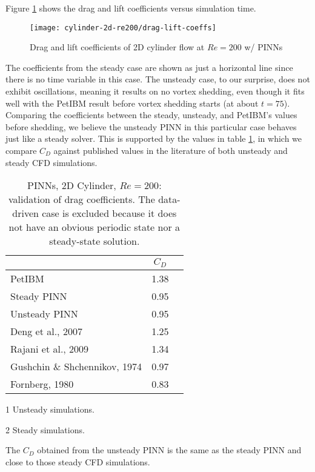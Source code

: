 Figure \ref{fig:cylinder-re200-drag-lift} shows the drag and lift coefficients versus simulation time.
\begin{figure}[t]
    \centering%
    \texttt{[image: cylinder-2d-re200/drag-lift-coeffs]}%
    \caption{%
        Drag and lift coefficients of 2D cylinder flow at $Re=\num{200}$ w/ PINNs
    }
    \label{fig:cylinder-re200-drag-lift}%
\end{figure}
The coefficients from the steady case are shown as just a horizontal line since there is no time variable in this case.
The unsteady case, to our surprise, does not exhibit oscillations, meaning it results on no vortex shedding, even though it fits well with the PetIBM result before vortex shedding starts (at about $t=75$).
Comparing the coefficients between the steady, unsteady, and PetIBM's values before shedding, we believe the unsteady PINN in this particular case behaves just like a steady solver.
This is supported by the values in table \ref{table:cylinder-2d-re200-cd}, in which we compare $C_D$ against published values in the literature of both unsteady and steady CFD simulations.
\begin{table}
    \centering%
    \begin{threeparttable}[b]
        \begin{tabular}{lcc}
            \toprule
            & $C_D$ \\
            \midrule
            PetIBM & 1.38   \\
            Steady PINN & 0.95 \\
            Unsteady PINN & 0.95 \\
            Deng et al., 2007\cite{deng_hydrodynamic_2007}\tnote{1} & 1.25 \\
            Rajani et al., 2009\cite{Rajani2009}\tnote{1} & 1.34 \\
            Gushchin \& Shchennikov, 1974\cite{gushchin_numerical_1974}\tnote{2} & 0.97 \\
            Fornberg, 1980\cite{fornberg_numerical_1980}\tnote{2} & 0.83 \\
            \bottomrule
        \end{tabular}%
        \begin{tablenotes}
            \footnotesize
            \item [1] Unsteady simulations.
            \item [2] Steady simulations.
        \end{tablenotes}
        \caption{%
            PINNs, 2D Cylinder, $Re=200$: validation of drag coefficients.%
            The data-driven case is excluded because it does not have an obvious periodic state nor a steady-state solution.%
        }%
        \label{table:cylinder-2d-re200-cd}
    \end{threeparttable}
\end{table}%
The $C_D$ obtained from the unsteady PINN is the same as the steady PINN and close to those steady CFD simulations.

